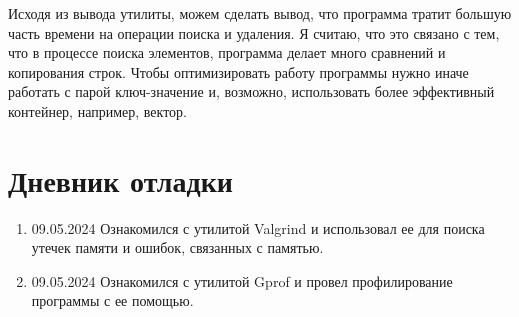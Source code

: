 Исходя из вывода утилиты, можем сделать вывод, что программа тратит большую часть времени на операции поиска и удаления. 
Я считаю, что это связано с тем, что в процессе поиска элементов, программа делает много сравнений и копирования строк. 
Чтобы оптимизировать работу программы нужно иначе работать с парой ключ-значение и, возможно, 
использовать более эффективный контейнер, например, вектор.
\pagebreak

\section{Дневник отладки}
\begin{enumerate}
    \item 09.05.2024 Ознакомился с утилитой Valgrind и использовал ее для поиска утечек памяти и ошибок, связанных с памятью.
    \item 09.05.2024 Ознакомился с утилитой Gprof и провел профилирование программы с ее помощью.
\end{enumerate}
\pagebreak
